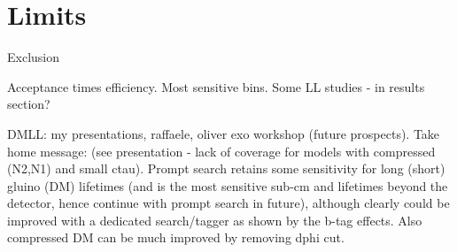 \section{Limits}
Exclusion 





Acceptance times efficiency.
Most sensitive bins.
Some LL studies - in results section?


DMLL: my presentations, raffaele, oliver exo workshop (future prospects).
Take home message: (see presentation - lack of coverage for models with 
compressed (N2,N1) and small ctau). Prompt search retains some sensitivity 
for long (short) gluino (DM) lifetimes (and is the most sensitive sub-cm and 
lifetimes beyond the detector, hence continue with prompt search in future), 
although clearly could be improved with a dedicated search/tagger as shown by 
the b-tag effects. Also compressed DM can be much improved by removing dphi cut.


